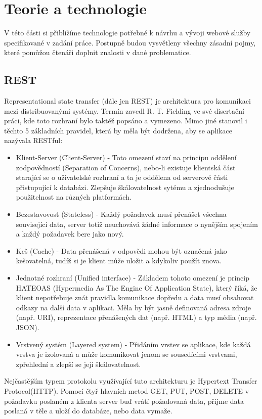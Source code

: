    
  \chapter{Teorie a technologie}
  V této části si přiblížíme technologie potřebné k návrhu a vývoji webové služby specifikované v zadání práce. Postupně budou vysvětleny všechny zásadní pojmy, které pomůžou čtenáři doplnit znalosti v dané problematice.
  
  \section{REST}
	Representational state transfer (dále jen REST) je architektura pro komunikaci  mezi distribuovanými systémy. Termín zavedl R. T. Fielding ve své disertační práci\cite{restThesis}, kde toto rozhraní bylo taktéž popsáno a vymezeno. Mimo jiné stanovil i těchto 5 základních pravidel, která by měla být dodržena, aby se aplikace nazývala RESTful\cite{rest}:
	\begin{itemize}
		\item Klient-Server (Client-Server) - Toto omezení staví na principu oddělení zodpovědností (Separation of Concerns), nebo-li existuje klientská část starající se o uživatelské rozhraní a ta je oddělena od serverové části přistupující k databázi. Zlepšuje škálovatelnost sytému a zjednodušuje použitelnost na různých platformách.
		\item Bezestavovost (Stateless) - Každý požadavek musí přenášet všechna související data, server totiž neuchovává žádné informace o nynějším spojením a každý požadavek bere jako nový.
		\item Keš (Cache) - Data přenášená v odpovědi mohou být označená jako kešovatelná, tudíž si je klient může uložit a kdykoliv použít znova.
		\item Jednotné rozhraní (Unified interface) - Základem tohoto omezení je princip HATEOAS (Hypermedia As The Engine Of Application State), který říká, že klient nepotřebuje znát pravidla komunikace dopředu a data musí obsahovat odkazy na další data v aplikaci. Měla by být jasně definovaná adresa zdroje (např. URI), reprezentace přenášených dat (např. HTML) a typ média (např. JSON).
		\item Vrstvený systém (Layered system) - Přidáním vrstev se aplikace, kde každá vrstva je izolovaná a může komunikovat jenom se sousedícími vrstvami, zpřehlední a zlepší se její škálovatelnost.
	\end{itemize}	
	Nejčastějším typem protokolu využívající tuto architekturu je Hypertext Transfer Protocol(HTTP). Pomocí čtyř hlavních metod GET, PUT, POST, DELETE v požadavku poslaném z klienta server buď vrátí požadovaná data, přijme data poslaná v těle a uloží do databáze, nebo data vymaže. 

